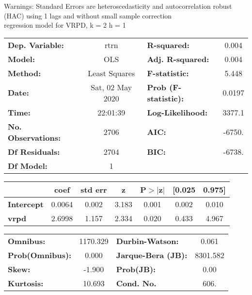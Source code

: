 Warnings: \newline
 [1] Standard Errors are heteroscedasticity and autocorrelation robust (HAC) using 1 lags and without small sample correction\\ 

regression model for VRPD, k = 2 h = 1\begin{center}
\begin{tabular}{lclc}
\toprule
\textbf{Dep. Variable:}    &       rtrn       & \textbf{  R-squared:         } &     0.004   \\
\textbf{Model:}            &       OLS        & \textbf{  Adj. R-squared:    } &     0.004   \\
\textbf{Method:}           &  Least Squares   & \textbf{  F-statistic:       } &     5.448   \\
\textbf{Date:}             & Sat, 02 May 2020 & \textbf{  Prob (F-statistic):} &   0.0197    \\
\textbf{Time:}             &     22:01:39     & \textbf{  Log-Likelihood:    } &    3377.1   \\
\textbf{No. Observations:} &        2706      & \textbf{  AIC:               } &    -6750.   \\
\textbf{Df Residuals:}     &        2704      & \textbf{  BIC:               } &    -6738.   \\
\textbf{Df Model:}         &           1      & \textbf{                     } &             \\
\bottomrule
\end{tabular}
\begin{tabular}{lcccccc}
                   & \textbf{coef} & \textbf{std err} & \textbf{z} & \textbf{P$> |$z$|$} & \textbf{[0.025} & \textbf{0.975]}  \\
\midrule
\textbf{Intercept} &       0.0064  &        0.002     &     3.183  &         0.001        &        0.002    &        0.010     \\
\textbf{vrpd}      &       2.6998  &        1.157     &     2.334  &         0.020        &        0.433    &        4.967     \\
\bottomrule
\end{tabular}
\begin{tabular}{lclc}
\textbf{Omnibus:}       & 1170.329 & \textbf{  Durbin-Watson:     } &    0.061  \\
\textbf{Prob(Omnibus):} &   0.000  & \textbf{  Jarque-Bera (JB):  } & 8301.582  \\
\textbf{Skew:}          &  -1.900  & \textbf{  Prob(JB):          } &     0.00  \\
\textbf{Kurtosis:}      &  10.693  & \textbf{  Cond. No.          } &     606.  \\
\bottomrule
\end{tabular}
\end{center}


